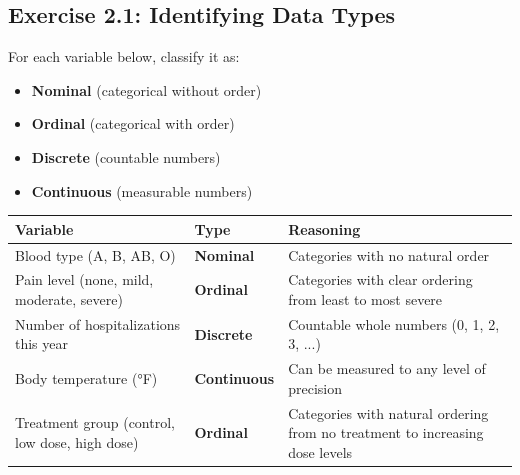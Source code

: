 \documentclass[11pt]{article}
\begin{document}
\subsection{Exercise 2.1: Identifying Data Types}
For each variable below, classify it as:
\begin{itemize}
\item \textbf{Nominal} (categorical without order)
\item \textbf{Ordinal} (categorical with order)
\item \textbf{Discrete} (countable numbers)
\item \textbf{Continuous} (measurable numbers)
\end{itemize}

\begin{center}
\begin{tabular}{|>{\raggedright\arraybackslash}p{4.8cm}|>{\centering\arraybackslash}p{2.2cm}|>{\raggedright\arraybackslash}p{5.5cm}|}
\hline
\textbf{Variable} & \textbf{Type} & \textbf{Reasoning} \\
\hline
Blood type (A, B, AB, O) & \textcolor{answergreen}{\textbf{Nominal}} & \textcolor{answergreen}{Categories with no natural order} \\[2ex]
\hline
Pain level (none, mild, moderate, severe) & \textcolor{answergreen}{\textbf{Ordinal}} & \textcolor{answergreen}{Categories with clear ordering from least to most severe} \\[2ex]
\hline
Number of hospitalizations this year & \textcolor{answergreen}{\textbf{Discrete}} & \textcolor{answergreen}{Countable whole numbers (0, 1, 2, 3, ...)} \\[2ex]
\hline
Body temperature (°F) & \textcolor{answergreen}{\textbf{Continuous}} & \textcolor{answergreen}{Can be measured to any level of precision} \\[2ex]
\hline
Treatment group (control, low dose, high dose) & \textcolor{answergreen}{\textbf{Ordinal}} & \textcolor{answergreen}{Categories with natural ordering from no treatment to increasing dose levels} \\[2ex]
\hline
\end{tabular}
\end{center}
\end{document}

